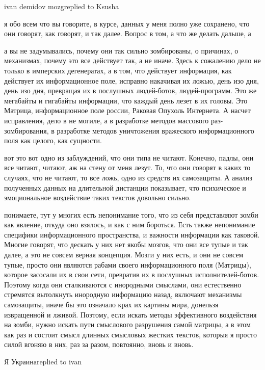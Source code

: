 ivan demidov mozgreplied to Ksusha

я обо всем что вы говорите, в курсе, данных у меня полно уже сохранено, что они
говорят, как говорят, и так далее. Вопрос в том, а что же делать дальше, а

а вы не задумывались, почему они так сильно зомбированы, о причинах, о
механизмах, почему это все действует так, а не иначе. Здесь к сожалению дело не
только в имперских дегенератах, а в том, что действует информация, как
действует их информационное поле, исправно накачивая их ложью, день изо дня,
день изо дня, превращая их в послушных людей-ботов, людей-программ. Это же
мегабайты и гигабайты информации, что каждый день лезет в их головы. Это
Матрица, информационное поле россии, Раковая Опухоль Интернета. А насчет
исправления, дело в не могиле, а в разработке методов массового
раз-зомбирования, в разработке методов уничтожения вражеского информационного
поля как целого, как сущности.

вот это вот одно из заблуждений, что они типа не читают. Конечно, падлы, они
все читают, читают, аж на стену от меня лезут. То, что они говорят в каких то
случаях, что не читают, то все ложь, одно из средств их самозащиты. А анализ
полученных данных на длительной дистанции показывает, что психическое и
эмоциональное воздействие таких текстов довольно сильно.


понимаете, тут у многих есть непонимание того, что из себя представляют зомби
как явление, откуда оно взялось, и как с ним бороться. Есть также непонимание
специфики информационного пространства, и важности информации как таковой.
Многие говорят, что дескать у них нет якобы мозгов, что они все тупые и так
далее, а это не совсем верная концепция. Мозги у них есть, и они не совсем
тупые, просто они являются рабами своего информационного поля (Матрицы),
которое засосали их в свои сети, превратив их в послушных исполнителей-ботов.
Поэтому когда они сталкиваются с инородными смыслами, они естественно стремятся
вытолкнуть инородную информацию назад, включают механизмы самозащиты, иначе бы
это означало крах их картины мира, донельзя извращенной и лживой. Поэтому, если
искать методы эффективного воздействия на зомби, нужно искать пути смыслового
разрушения самой матрицы, а в этом как раз и состоит смысл длинных смысловых
жестких текстов, которыя я просто силой вгоняю в них, раз за разом, повтоянно,
вновь и вновь.

Я Украинаreplied to ivan

